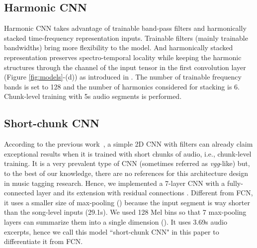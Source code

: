 \documentclass{article}
\begin{document}
\subsection{Harmonic CNN}
Harmonic CNN \cite{won2020data} takes advantage of trainable band-pass filters and harmonically stacked time-frequency representation inputs. Trainable filters (mainly trainable bandwidths) bring more flexibility to the model. And harmonically stacked representation preserves spectro-temporal locality while keeping the harmonic structures through the channel of the input tensor in the first convolution layer (Figure \ref{fig:models}-(d)) as introduced in \cite{bittner2017deep}. The number of trainable frequency bands is set to 128 and the number of harmonics considered for stacking is 6. Chunk-level training with 5s audio segments is performed.

\subsection{Short-chunk CNN}
According to the previous work~\cite{won2020data}, a simple 2D CNN with  filters can already claim exceptional results when it is trained with short chunks of audio, i.e., chunk-level training. It is a  very prevalent type of CNN (sometimes referred as \textit{vgg}-like) but, to the best of our knowledge, there are no references for this architecture design in music tagging research. Hence, we implemented a 7-layer CNN with a fully-connected layer and its extension with residual connections \cite{he2016deep}. Different from FCN, it uses a smaller size of max-pooling () because the input segment is way shorter than the song-level inputs (29.1s). We used 128 Mel bins so that 7 max-pooling layers can summarize them into a single dimension (). It uses 3.69s audio excerpts, hence we call this model ``short-chunk CNN" in this paper to differentiate it from FCN.


 
\end{document}

